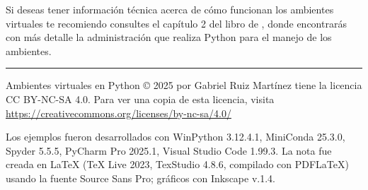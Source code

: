 Si deseas tener información técnica acerca de cómo funcionan los ambientes virtuales te recomiendo consultes el capítulo 2 del libro de \citet{jolowicz2024}, donde encontrarás con más detalle la administración que realiza Python para el manejo de los ambientes.
	
\nocite{anaconda2025}
\nocite{python2025}
\nocite{pythont2025}
\nocite{rohowsky2023}
\nocite{vsc2025}
\nocite{mayer2012}
	

	

	

\vspace{0.5cm}
\hrule 
\vspace{0.25cm}
{\footnotesize Ambientes virtuales en Python © 2025 por Gabriel Ruiz Martínez tiene la licencia CC BY-NC-SA 4.0. Para ver una copia de esta licencia, visita  \url{https://creativecommons.org/licenses/by-nc-sa/4.0/}\bigskip
	
Los ejemplos fueron desarrollados con WinPython 3.12.4.1, MiniConda 25.3.0, Spyder 5.5.5, PyCharm Pro 2025.1, Visual Studio Code 1.99.3. La nota fue creada en \LaTeX{} (TeX Live 2023, TexStudio 4.8.6, compilado con PDFLaTeX) usando la fuente Source Sans Pro; gráficos con Inkscape v.1.4.}